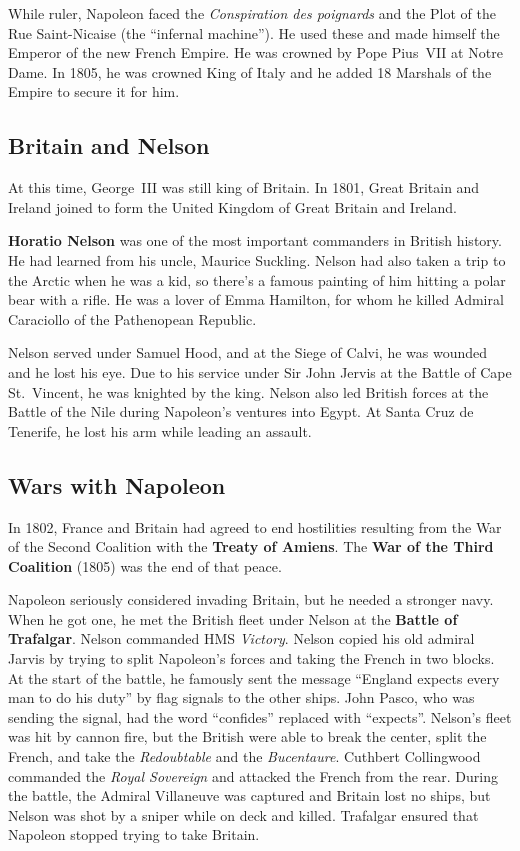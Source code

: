 While ruler, Napoleon faced the \textit{Conspiration des poignards}
and the Plot of the Rue Saint-Nicaise (the ``infernal machine'').
He used these and made himself the Emperor of the new French Empire.
He was crowned by Pope Pius~VII at Notre Dame.
In 1805, he was crowned King of Italy and he added 18 Marshals of the Empire to secure it for him.

\subsection*{Britain and Nelson}

At this time, George~III was still king of Britain.
In 1801, Great Britain and Ireland joined to form the United Kingdom of Great Britain and Ireland.

\textbf{Horatio Nelson} was one of the most important commanders in British history.
He had learned from his uncle, Maurice Suckling.
Nelson had also taken a trip to the Arctic when he was a kid,
so there's a famous painting of him hitting a polar bear with a rifle.
He was a lover of Emma Hamilton, for whom he killed Admiral Caraciollo of the Pathenopean Republic.

Nelson served under Samuel Hood, and at the Siege of Calvi, he was wounded and he lost his eye.
Due to his service under Sir John Jervis at the Battle of Cape St.\ Vincent,
he was knighted by the king.
Nelson also led British forces at the Battle of the Nile during Napoleon's ventures into Egypt.
At Santa Cruz de Tenerife, he lost his arm while leading an assault.

\subsection*{Wars with Napoleon}

In 1802,
France and Britain had agreed to end hostilities resulting from the War of the Second Coalition
with the \textbf{Treaty of Amiens}.
The \textbf{War of the Third Coalition} (1805) was the end of that peace.

Napoleon seriously considered invading Britain, but he needed a stronger navy.
When he got one, he met the British fleet under Nelson at the \textbf{Battle of Trafalgar}.
Nelson commanded HMS \textit{Victory}.
Nelson copied his old admiral Jarvis by trying to split Napoleon's forces
and taking the French in two blocks.
At the start of the battle, he famously sent the message
``England expects every man to do his duty'' by flag signals to the other ships.
John Pasco, who was sending the signal, had the word ``confides'' replaced with ``expects''.
Nelson's fleet was hit by cannon fire,
but the British were able to break the center, split the French,
and take the \textit{Redoubtable} and the \textit{Bucentaure}.
Cuthbert Collingwood commanded the \textit{Royal Sovereign} and attacked the French from the rear.
During the battle, the Admiral Villaneuve was captured and Britain lost no ships,
but Nelson was shot by a sniper while on deck and killed.
Trafalgar ensured that Napoleon stopped trying to take Britain.

